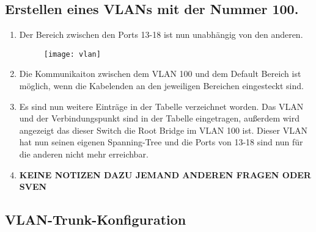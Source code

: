 \documentclass{scrartcl}
\begin{document}
  \subsection[Aufgabe 7 Erstellen eines VLANs mit der Nummer 100]{Erstellen eines VLANs mit der Nummer 100.}
  
  \renewcommand{\labelenumi}{\alph{enumi})}
  \begin{enumerate}
    \item
    Der Bereich zwischen den Ports 13-18 ist nun unabhängig von den anderen.
    
    \begin{figure}
    \texttt{[image: vlan]}
    \label{fig:vlan}
    \end{figure}
    
    \item
    Die Kommunikaiton zwischen dem VLAN 100 und dem Default Bereich ist möglich, wenn die Kabelenden an den jeweiligen Bereichen eingesteckt sind.
    
    \item
    Es sind nun weitere Einträge in der Tabelle verzeichnet worden. Das VLAN und der Verbindungspunkt sind in der Tabelle eingetragen, außerdem wird angezeigt das dieser Switch die Root Bridge im VLAN 100 ist. Dieser VLAN hat nun seinen eigenen Spanning-Tree und die Ports von 13-18 sind nun für die anderen nicht mehr erreichbar.
    
    \item
    \textbf{KEINE NOTIZEN DAZU JEMAND ANDEREN FRAGEN ODER SVEN}
    
  \end{enumerate}
    
  \subsection[Aufgabe 8 VLAN-Trunk-Konfiguration]{VLAN-Trunk-Konfiguration}
    
\end{document}
